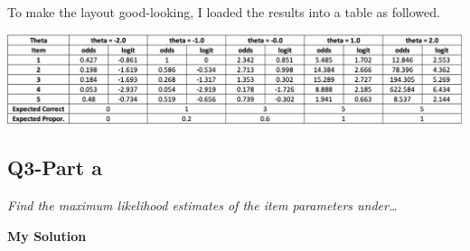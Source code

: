 \documentclass[
]{article}
\begin{document}
To make the layout good-looking, I loaded the results into a table as
followed.

\includegraphics{table_1.png}

\hypertarget{q3-part-a}{%
\subsection{Q3-Part a}\label{q3-part-a}}

\emph{Find the maximum likelihood estimates of the item parameters
under\ldots{}}

\textbf{My Solution}
\end{document}
